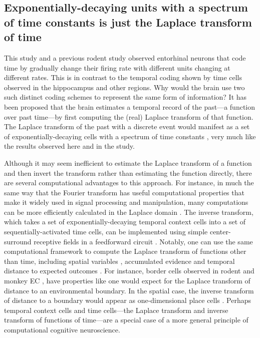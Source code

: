 \documentclass{apa}
\begin{document}
\subsection*{Exponentially-decaying units with a spectrum of time constants is
just the Laplace transform of time}

This study and a previous rodent study \cite{TsaoEtal18} observed entorhinal
neurons that code time by gradually change their firing rate with different
units changing at different rates.  This is in contrast to the temporal coding
shown by time cells observed in the hippocampus and other regions.  Why would
the brain use two such distinct coding schemes to represent the same form of
information?
It has been proposed \cite{ShanHowa12,ShanHowa13,HowaEtal14} that the brain
estimates a temporal record of the past---a function over past time---by
first computing the (real) Laplace transform of that function.  
The Laplace transform of the
past with a discrete event would manifest as a set of exponentially-decaying
cells with a spectrum of time constants \cite{HowaEtal14}, very much like the
results observed here and in the  study.  

Although it may seem inefficient to estimate the Laplace transform of a
function and then invert the transform rather than estimating the function
directly, there are several computational advantages to this approach.  For
instance, in much the same way that the Fourier transform has useful
computational properties that make it widely used in signal processing and
manipulation, many computations can be more efficiently calculated in the
Laplace domain \cite{HowaEtal16}.  The inverse transform, which takes a set of
exponentially-decaying temporal context cells into a set of
sequentially-activated time cells, can be implemented using simple
center-surround receptive fields in a feedforward circuit
\cite{ShanHowa13,LiuEtal18}.  Notably, one can use the same computational
framework to compute the Laplace transform of functions other than time,
including spatial variables \cite{HowaEtal14}, accumulated evidence
\cite{HowaEtal18} and temporal distance to expected outcomes
\cite{MomeHowa18}.  For instance, border cells observed in rodent and monkey
EC \cite{SolsEtal08,KillEtal12,HardEtal15}, have properties like one would
expect for the Laplace transform of distance to an environmental boundary.  In
the spatial case, the inverse transform of distance to a boundary would appear
as one-dimensional place cells
\cite{GothEtal96,LeveEtal09,BurgOKee96}.  Perhaps temporal
context cells and time cells---the Laplace transform and inverse transform of
functions of time---are a special case of a more general principle of
computational cognitive neuroscience. 
\end{document}
